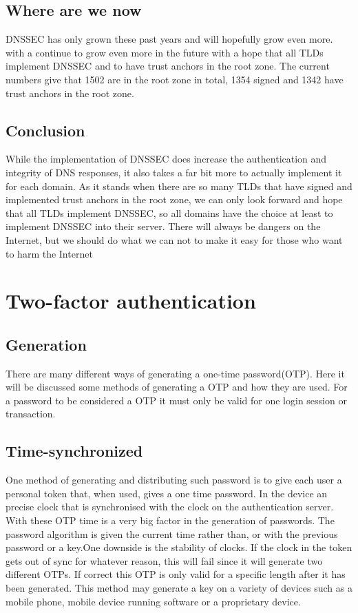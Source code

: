 \documentclass{article}
\begin{document}
        \subsection{Where are we now}
		DNSSEC has only grown these past years and will hopefully grow even more. with a continue to grow even more in the future with a hope that all TLDs implement DNSSEC and to have trust anchors in the root zone. The current numbers give that 1502 are in the root zone in total, 1354 signed and 1342 have trust anchors in the root zone.\cite{icannStats}
		\subsection{Conclusion}
		While the implementation of DNSSEC does increase the authentication and integrity of DNS responses, it also takes a far bit more to actually implement it for each domain. As it stands when there are so many TLDs that have signed and implemented trust anchors in the root zone, we can only look forward and hope that all TLDs implement DNSSEC, so all domains have the choice at least to implement DNSSEC into their server.
	    There will always be dangers on the Internet, but we should do what we can not to make it easy for those who want to harm the Internet
	\section{Two-factor authentication}
        \subsection{Generation}
    	There are many different ways of generating a one-time password(OTP). Here it will be discussed some methods of generating a OTP and how they are used. For a password to be considered a OTP it must only be valid for one login session or transaction. 
    		\subsection{Time-synchronized}
            One method of generating and distributing such password is to give each user a personal token that, when used, gives a one time password. In the device an precise clock that is synchronised with the clock on the authentication server. With these OTP time is a very big factor in the generation of passwords. The password algorithm is given the current time rather than, or with the previous password or a key.One downside is the stability of clocks. If the clock in the token gets out of sync for whatever reason, this will fail since it will generate two different OTPs. If correct this OTP is only valid for a specific length after it has been generated. This method may generate a key on a variety of devices such as a mobile phone, mobile device running software or a proprietary device. 
\end{document}
